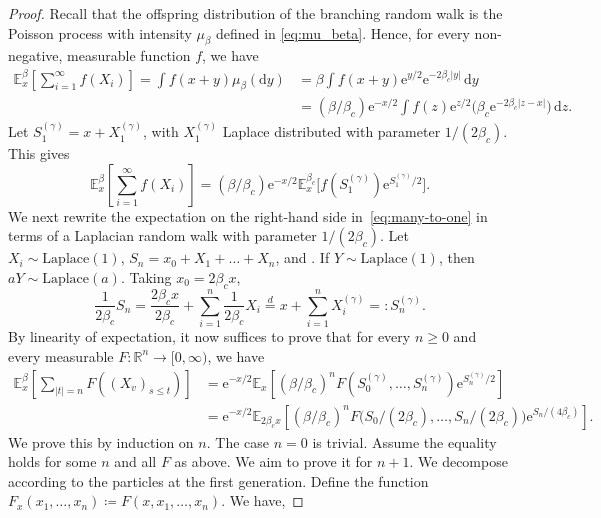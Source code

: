 \documentclass[a4paper, a4wide, 10pt, reqno]{amsart}
\theoremstyle{plain}
\theoremstyle{definition}
\numberwithin{equation}{section}
\newcommand{\R}{{\mathbb R}}
\newcommand{\E}{\mathbb E}
\newcommand{\re}{{\mathrm e}}
\newcommand{\rd}{\mathrm{d}}
\begin{document}
\begin{proof}
Recall that the offspring distribution of the branching random walk is the Poisson process with intensity $\mu_\beta$ defined in \eqref{eq:mu_beta}. Hence, for every non-negative, measurable function $f$, we have
\begin{align*}
	\label{eq:many-to-one-1}
	\E_x^\beta\left[\sum_{i=1}^\infty f(X_i)\right] 
    = \int f(x+y) \mu_\beta(\rd y) 
    &= \beta \int f(x+y)\re^{y/2} \re^{-2\beta_c|y|}\,\rd y\\
    &= (\beta/\beta_c) \re^{-x/2}\int f(z)\re^{z/2} \big(\beta_c\re^{-2\beta_c|z-x|}\big)\,\rd z.
\end{align*}
Let $S_1^{(\gamma)}=x+X_1^{(\gamma)}$, with $X_1^{(\gamma)}$ Laplace distributed with parameter $1/(2\beta_c)$. This gives
\begin{equation}
	\label{eq:many-to-one-1}
	\E_x^\beta\left[\sum_{i=1}^\infty f(X_i)\right] = (\beta/\beta_c)\re^{-x/2} \E_x^{\beta_c}\big[f(S_1^{(\gamma)})\re^{S_1^{(\gamma)}/2}\big].
\end{equation}
    We next rewrite the expectation on the right-hand side in~\eqref{eq:many-to-one} in terms of a Laplacian random walk with parameter $1/(2\beta_c)$. Let $X_i\sim\mathrm{Laplace}(1)$, $S_n=x_0+X_1+\ldots+X_n$, and .
        If $Y\sim\mathrm{Laplace}(1)$, then $aY\sim\mathrm{Laplace}(a)$. Taking $x_0=2\beta_cx$,
        \[
        \frac{1}{2\beta_c}S_n = \frac{2\beta_cx}{2\beta_c} + \sum_{i=1}^n\frac{1}{2\beta_c}X_i \overset{d}= x + \sum_{i=1}^n X_i^{(\gamma)} =: S_n^{(\gamma)}.
        \]
	By linearity of expectation, it now suffices to prove that for every $n\ge 0$ and every  measurable $F\colon {\R}^n\to [0,\infty)$, we have 
	\begin{equation}
		\label{eq:induction_to_show}
        \begin{aligned}
		\E_x^\beta\left[\sum_{|t|=n} F((X_v)_{s\le t})\right] &= \re^{-x/2}\E_x\left[(\beta/\beta_c)^nF(S_0^{(\gamma)},\ldots,S_n^{(\gamma)})\re^{S_n^{(\gamma)}/2}\right] \\ &=\re^{- x/2}\E_{ 2\beta_c x}\left[(\beta/\beta_c)^nF\big(S_0/(2\beta_c),\ldots,S_n/(2\beta_c)\big)\re^{ S_n/(4\beta_c)}\right].
        \end{aligned}
	\end{equation}
	We prove this by induction on $n$. The case $n=0$ is trivial. Assume the equality holds for some $n$ and all $F$ as above. We aim to prove it for $n+1$. We decompose according to the particles at the first generation. Define the function $F_x(x_1,\ldots,x_n) \coloneqq F(x,x_1,\ldots,x_n)$. We have,

\end{proof}
\end{document}
